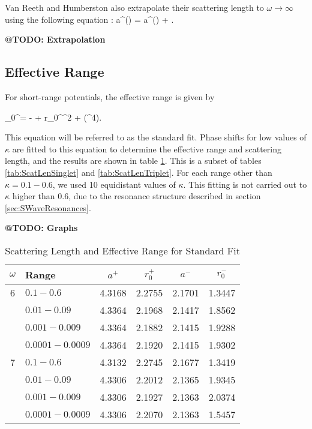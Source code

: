 \documentclass[Dissertation.tex]{subfiles}
\begin{document}
\noindent Van Reeth and Humberston also extrapolate their scattering length to $\omega \rightarrow \infty$ using the following equation \cite{VanReeth2003}:
\beq
\label{eq:ScatLenExtrap}
a^\pm(\omega) = a^\pm(\omega \rightarrow \infty) + .
\eeq

\textbf{@TODO: Extrapolation}


\subsection{Effective Range}
For short-range potentials, the effective range is given by \cite{Bethe1949} \cite{Blatt1949} \cite[pg. 668]{Drake2006}

\beq
\label{eq:EffectiveRangeShort}
\kappa \cot\eta_0^\pm = - +  r_0^\pm \kappa^2 + (\kappa^4).
\eeq

\noindent This equation will be referred to as the standard fit. Phase shifts for low values of $\kappa$ are fitted to this equation to determine the effective range and scattering length, and the results are shown in table \ref{tab:ScatLenStandard}. This is a subset of tables \ref{tab:ScatLenSinglet} and \ref{tab:ScatLenTriplet}. For each range other than $\kappa = 0.1 - 0.6$, we used 10 equidistant values of $\kappa$. This fitting is not carried out to $\kappa$ higher than 0.6, due to the resonance structure described in section \ref{sec:SWaveResonances}.

\textbf{@TODO: Graphs}

\begin{table}[H]
\begin{center}
\begin{tabular}{c l c c c c}
\toprule
$\omega$ & Range & $a^+$ & $r_0^+$ & $a^-$ & $r_0^-$ \\
\midrule
6 & $0.1 - 0.6$ & 4.3168 & 2.2755 & 2.1701 & 1.3447 \\
  & $0.01 - 0.09$ & 4.3364 & 2.1968 & 2.1417 & 1.8562 \\
  & $0.001 - 0.009$ & 4.3364 & 2.1882 & 2.1415 & 1.9288 \\
  & $0.0001 - 0.0009$ & 4.3364 & 2.1920 & 2.1415 & 1.9302 \\
\midrule
7 & $0.1 - 0.6$ & 4.3132 & 2.2745 & 2.1677 & 1.3419 \\
  & $0.01 - 0.09$ & 4.3306 & 2.2012 & 2.1365 & 1.9345 \\
  & $0.001 - 0.009$ & 4.3306 & 2.1927 & 2.1363 & 2.0374 \\
  & $0.0001 - 0.0009$ & 4.3306 & 2.2070 & 2.1363 & 1.5457 \\
\bottomrule
\end{tabular}
\caption{Scattering Length and Effective Range for Standard Fit}
\label{tab:ScatLenStandard}
\end{center}
\end{table}
\end{document}
